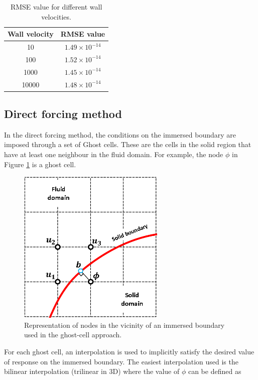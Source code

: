 \begin{table}[H]
\centering
\begin{tabular}{c | c}
	 Wall velocity & RMSE value \\ \hline \hline
	 10 & $1.49 \times 10^{-14}$ \\ \hline
	 100 & $1.52 \times 10^{-14}$ \\ \hline
	 1000 & $1.45 \times 10^{-14}$ \\ \hline
	 10000 & $1.48 \times 10^{-14}$

\end{tabular}
\caption{RMSE value for different wall velocities.}
\label{table:C3_indirectForcing_wallVelocityRSME}
\end{table}

\subsection{Direct forcing method}
In the direct forcing method, the conditions on the immersed boundary are imposed through a set of Ghost cells. These are the cells in the solid region that have at least one neighbour in the fluid domain. For example, the node $\phi$ in Figure \ref{fig:C3_ghostCell} is a ghost cell.

\begin{figure}[H]
	\centering
	\includegraphics[width=7.00cm]{Chapter_3/figure/discrete_forcing_approach.png}
	\caption{Representation of nodes in the vicinity of an immersed boundary used in the ghost-cell approach.}
	\label{fig:C3_ghostCell}
\end{figure}

For each ghost cell, an interpolation is used to implicitly satisfy the desired value of response on the immersed boundary. The easiest interpolation used is the bilinear interpolation (trilinear in 3D) where the value of $\phi$ can be defined as

